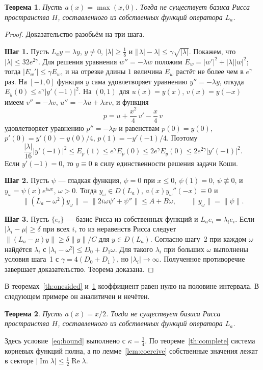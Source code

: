 \documentclass[12pt,a4paper]{article}
\newtheorem{theorem}{Теорема}
\theoremstyle{definition}
\newcommand{\step}[1]{\smallskip\noindent\textbf{Шаг #1.}}
\newcommand{\norm}[1]{\lVert#1\rVert}
\newcommand{\abs}[1]{\lvert#1\rvert}
\begin{document}
\begin{theorem}\label{th:ramp}
Пусть $a(x)=\max(x,0)$. Тогда не существует базиса Рисса пространства $H$, составленного
из собственных функций оператора $L_a$.
\end{theorem}
\begin{proof}
Доказательство разобьём на три шага.

\step{1} Пусть $L_ay=\lambda y$, $y\ne0$, $\abs\lambda\ge\tfrac18$ и
$\bigl\lvert\abs\lambda-\lambda\bigr\rvert\le\gamma\sqrt{\abs\lambda}$. Покажем, что
$\abs\lambda\le32e^{2\gamma}$. Для решения уравнения $w''=-\lambda w$ положим
$E_w=\abs{w'}^2+\abs\lambda\abs w^2$; тогда $\abs{E_w'}\le\gamma E_w$, и на отрезке
длины $1$ величина $E_w$ растёт не более чем в $e^\gamma$ раз. На $[-1,0]$ функция $y$
сама удовлетворяет уравнению $y''=-\lambda y$, откуда
$E_y(0)\le e^\gamma\abs{y'(-1)}^2$. На $(0,1)$ для $u(x)=y(x)$, $v(x)=y(-x)$ имеем
$v''=-\lambda v$, $u''=-\lambda u+\lambda xv$, и функция
\[
 p=u+\frac{x^2}4\,v'-\frac x4\,v
\]
удовлетворяет уравнению $p''=-\lambda p$ и равенствам $p(0)=y(0)$,
$p'(0)=y'(0)-y(0)/4$, $p(1)=-y'(-1)/4$. Поэтому
\[
 \frac{\abs\lambda}{16}\abs{y'(-1)}^2\le E_p(1)\le e^\gamma E_p(0)\le2e^\gamma E_y(0)
 \le2e^{2\gamma}\abs{y'(-1)}^2 .
\]
Если $y'(-1)=0$, то $y\equiv0$ в силу единственности решения задачи Коши.

\step{2} Пусть $\psi$ --- гладкая функция, $\psi=0$ при $x\le0$, $\psi(1)=0$,
$\psi\not\equiv0$, и $y_\omega=\psi(x)e^{i\omega x}$, $\omega>0$. Тогда
$y_\omega\in D(L_a)$, $a(x)y_\omega''(-x)\equiv0$ и
\[
 \norm{(L_a-\omega^2)y_\omega}=\norm{2i\omega\psi'+\psi''}\le A+B\omega,\qquad
 \norm{y_\omega}=\norm\psi .
\]

\step{3} Пусть $\{e_i\}$ --- базис Рисса из собственных функций и
$L_ae_i=\lambda_ie_i$. Если $\abs{\lambda_i-\mu}\ge\delta$ при всех $i$, то из неравенств
Рисса следует $\norm{(L_a-\mu)y}\ge\delta\norm y/C$ для $y\in D(L_a)$. Согласно шагу~2
при каждом $\omega$ найдётся $\lambda_i$ с $\abs{\lambda_i-\omega^2}\le D_0+D_1\omega$.
Для такого $\lambda_i$ при больших $\omega$ выполнены условия шага~1 с
$\gamma=4(D_0+D_1)$, но $\abs{\lambda_i}\to\infty$. Полученное противоречие завершает
доказательство. Теорема доказана.
\end{proof}
В теоремах~\ref{th:onesided} и~\ref{th:ramp} коэффициент равен нулю на половине
интервала. В следующем примере он аналитичен и нечётен.

\begin{theorem}\label{th:half}
Пусть $a(x)=x/2$. Тогда не существует базиса Рисса пространства $H$, составленного из
собственных функций оператора $L_a$.
\end{theorem}
Здесь условие~\eqref{eq:bound} выполнено с $\kappa=\tfrac14$. По
теореме~\ref{th:complete} система корневых функций полна, а по
лемме~\ref{lem:coercive} собственные значения лежат в секторе
$\abs{\operatorname{Im}\lambda}\le\tfrac12\operatorname{Re}\lambda$.
\end{document}
